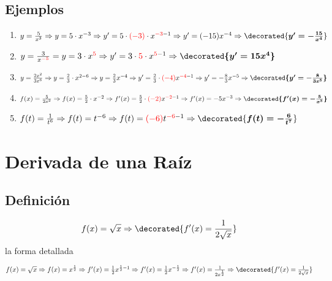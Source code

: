 \documentclass{article}
\newcommand{\tmcolor}[2]{{\color{#1}{#2}}}
\newcommand{\tmmathbf}[1]{\ensuremath{\boldsymbol{#1}}}
\begin{document}
\subsection{Ejemplos}


\begin{enumerate}
  \item $y = \frac{5}{x^3} \Rightarrow y = 5 \cdot x^{- 3} \Rightarrow y' = 5
  \cdot \tmcolor{red}{(- 3)} \cdot x^{\tmcolor{red}{- 3} - 1} \Rightarrow y' =
  (- 15) x^{- 4} \Rightarrow \decorated{\tmmathbf{y' = - \frac{15}{x^4}}}$
  
  \item $y = \frac{3}{x^{\tmcolor{red}{- 5}}} = y = 3 \cdot
  x^{\tmcolor{red}{5}} \Rightarrow y' = 3 \cdot \tmcolor{red}{5} \cdot
  x^{\tmcolor{red}{5} - 1} \Rightarrow \tmmathbf{\decorated{y' = 15 x^4}}$
  
  \item $y = \frac{2 x^2}{3 x^6} \Rightarrow y = \frac{2}{3} \cdot x^{2 - 6}
  \Rightarrow y = \frac{2}{3} x^{- 4} \Rightarrow y' = \frac{2}{3} \cdot
  \tmcolor{red}{(- 4)} x^{\tmcolor{red}{- 4} - 1} \Rightarrow y' = -
  \frac{8}{3} x^{- 5} \Rightarrow \tmmathbf{\decorated{y' = - \frac{8}{3
  x^5}}}$
  
  \item $f (x) = \frac{5}{2 x^2} \Rightarrow f (x) = \frac{5}{2} \cdot x^{- 2}
  \Rightarrow f' (x) = \frac{5}{2} \cdot \tmcolor{red}{(- 2)}
  x^{\tmcolor{red}{- 2} - 1} \Rightarrow f' (x) = - 5 x^{- 3} \Rightarrow
  \tmmathbf{\decorated{f' (x) = - \frac{5}{x^3}}}$
  
  \item $f (t) = \frac{1}{t^6} \Rightarrow f (t) = t^{- 6} \Rightarrow f (t) =
  \tmcolor{red}{(- 6)} t^{\tmcolor{red}{- 6} - 1} \Rightarrow
  \decorated{\tmmathbf{f (t) = - \frac{6}{t^7}}}$
\end{enumerate}

\section{Derivada de una Ra{\'i}z}

\subsection{Definici{\'o}n}

\[ f (x) = \sqrt{x} \Rightarrow \decorated{f' (x) = \frac{1}{2 \sqrt{x}}} \]
la forma detallada

$f (x) = \sqrt{x} \Rightarrow f (x) = x^{\frac{1}{2}} \Rightarrow f' (x) =
\frac{1}{2} x^{\frac{1}{2} - 1} \Rightarrow f' (x) = \frac{1}{2} x^{-
\frac{1}{2}} \Rightarrow f' (x) = \frac{1}{2 x^{\frac{1}{2}}} \Rightarrow
\decorated{f' (x) = \frac{1}{2 \sqrt{x}}}$
\end{document}

